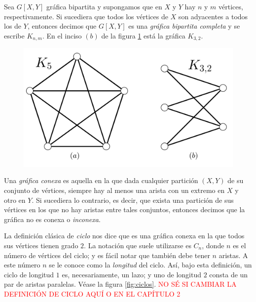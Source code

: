 Sea $G[X,Y]$ gráfica bipartita y supongamos que en $X$ y $Y$ hay $n$ y $m$ vértices, respectivamente. Si sucediera que todos los vértices de $X$ son adyacentes a todos los de $Y$, entonces decimos que $G[X,Y]$ es una \textit{gráfica bipartita completa} y se escribe $K_{n,m}$. En el inciso $(b)$ de la figura \ref{fig:grafoscompletos} está la gráfica $K_{3,2}$.

\begin{figure}[h]
    \centering
    \includegraphics[scale=0.2]{img/imgchapter1/GrafosCompletos.jpg}
    \caption{}
    \label{fig:grafoscompletos}
\end{figure}

Una \textit{gráfica conexa}  es aquella en la que dada cualquier partición $(X,Y)$ de su conjunto de vértices, siempre hay al menos una arista con un extremo en $X$ y otro en $Y$. Si sucediera lo contrario, es decir, que exista una partición de sus vértices en los que no hay aristas entre tales conjuntos, entonces decimos que la gráfica no es conexa o \textit{inconexa}.

La definición clásica de \textit{ciclo} nos dice que es una gráfica conexa en la que todos sus vértices tienen grado $2$. La notación que suele utilizarse es $C_{n}$, donde $n$ es el número de vértices del ciclo; y es fácil notar que también debe tener $n$ aristas. A este número $n$ se le conoce como la \textit{longitud} del ciclo. Así, bajo esta definición, un ciclo de longitud $1$ es, necesariamente, un lazo; y uno de longitud $2$ consta de un par de aristas paralelas. Véase la figura \ref{fig:ciclos}. \textcolor{red}{NO SÉ SI CAMBIAR LA DEFINICIÓN DE CICLO AQUÍ O EN EL CAPÍTULO 2}

